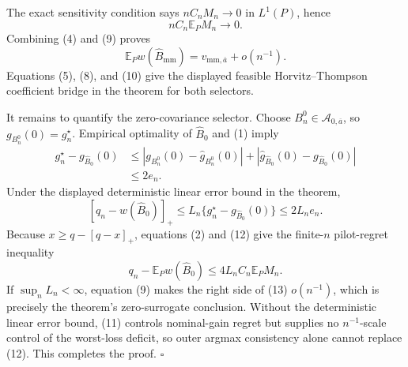 The exact sensitivity condition says \(nC_nM_n\to0\) in \(L^1(P)\), hence
\[
 nC_n\mathbb E_PM_n\longrightarrow0.
 \tag{9}
\]
Combining (4) and (9) proves
\[
 \mathbb E_Pw(\widehat B_{\mathrm{mm}})
 =v_{\mathrm{mm},\overline a}+o(n^{-1}).
 \tag{10}
\]
Equations (5), (8), and (10) give the displayed feasible Horvitz--Thompson coefficient bridge in the theorem for both selectors.

It remains to quantify the zero-covariance selector.  Choose \(B_n^0\in\mathcal A_{0,\overline a}\), so \(g_{B_n^0}(0)=g_n^\star\).  Empirical optimality of \(\widehat B_0\) and (1) imply
\[
 \begin{aligned}
 g_n^\star-g_{\widehat B_0}(0)
 &\leq
 |g_{B_n^0}(0)-\widehat g_{B_n^0}(0)|
 +|\widehat g_{\widehat B_0}(0)-g_{\widehat B_0}(0)|\\
 &\leq2e_n.
 \end{aligned}
 \tag{11}
\]
Under the displayed deterministic linear error bound in the theorem,
\[
 [q_n-w(\widehat B_0)]_+
 \leq L_n\{g_n^\star-g_{\widehat B_0}(0)\}
 \leq2L_ne_n.
 \tag{12}
\]
Because \(x\geq q-[q-x]_+\), equations (2) and (12) give the finite-\(n\) pilot-regret inequality
\[
 q_n-\mathbb E_Pw(\widehat B_0)
 \leq4L_nC_n\mathbb E_PM_n.
 \tag{13}
\]
If \(\sup_nL_n<\infty\), equation (9) makes the right side of (13) \(o(n^{-1})\), which is precisely the theorem's zero-surrogate conclusion.  Without the deterministic linear error bound, (11) controls nominal-gain regret but supplies no \(n^{-1}\)-scale control of the worst-loss deficit, so outer argmax consistency alone cannot replace (12).  This completes the proof. \(\square\)